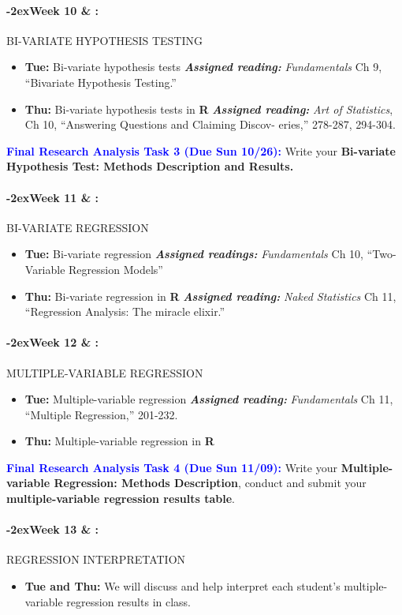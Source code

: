 \documentclass[11pt]{article}
\newcommand{\week}[1]{

  \paragraph*{\kern-2ex\quad #1 \AdvanceDate[1]\syldate{\today} \& \AdvanceDate[2]\syldate{\today} :}

  \ifdim\wd1=\wd\MONDAY
    \AdvanceDate[7]
  \else
    \AdvanceDate[7]
  \fi
}
\begin{document}
\week{Week 10} BI-VARIATE HYPOTHESIS TESTING
\begin{itemize}
    \item [] \textbf{Tue:} Bi-variate hypothesis tests
    \subitem \textit{\textbf{Assigned reading:}} \textit{Fundamentals} Ch 9, ``Bivariate Hypothesis Testing.''
    \item [] \textbf{Thu:} Bi-variate hypothesis tests in \textbf{\textsf{R}}
     \subitem \textbf{\textit{Assigned reading:}}
     \textit{Art of Statistics}, Ch 10, ``Answering Questions and Claiming Discov-\vspace{-5pt} \subitem eries,'' 278-287, 294-304.

\end{itemize}

\noindent \textcolor{blue}{\textbf{Final Research Analysis Task 3 (Due Sun 10/26):}} Write your \textbf{Bi-variate Hypothesis Test: Methods Description and Results.}

\week{Week 11} BI-VARIATE REGRESSION
\begin{itemize}
    \item [] \textbf{Tue:} Bi-variate regression
    \subitem \textbf{\textit{Assigned readings:}} \textit{Fundamentals} Ch 10, ``Two-Variable Regression Models''
    \item [] \textbf{Thu:} Bi-variate regression in \textbf{\textsf{R}}
    \subitem \textbf{\textit{Assigned reading:}} \textit{Naked Statistics} Ch 11, ``Regression Analysis: The miracle elixir.''
\end{itemize}

\week{Week 12} MULTIPLE-VARIABLE REGRESSION

\begin{itemize}
    \item [] \textbf{Tue:} Multiple-variable regression
    \subitem \textbf{\textit{Assigned reading:}} \textit{Fundamentals} Ch 11, ``Multiple Regression,'' 201-232.

    \item [] \textbf{Thu:} Multiple-variable regression in \textbf{\textsf{R}}
\end{itemize}

\noindent \textcolor{blue}{\textbf{Final Research Analysis Task 4 (Due Sun 11/09):}} Write your \textbf{Multiple-variable Regression: Methods Description}, conduct and submit your \textbf{multiple-variable regression results table}.

\week{Week 13} REGRESSION INTERPRETATION

\begin{itemize}
    \item []\textbf{Tue and Thu:} We will discuss and help interpret each student's multiple-variable regression results in class.
\end{itemize}
\end{document}
